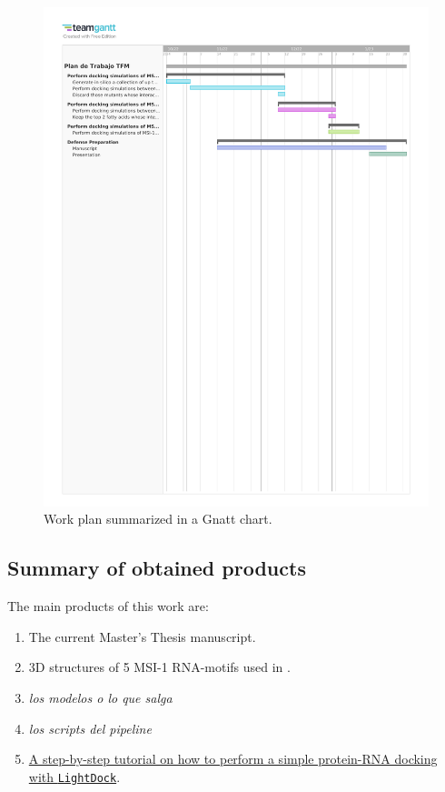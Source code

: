 \begin{figure}[htbp!]
    \centering
    \includegraphics[width=\linewidth, trim={1cm 18.5cm 1cm 2cm},clip]{assets/Plan_de_Trabajo_TFM.pdf}
    \caption{Work plan summarized in a Gnatt chart.}
    \label{fig:gnatt}    
\end{figure}

\subsection{Summary of obtained products}

The main products of this work are:

\begin{enumerate}
    \item The current Master's Thesis manuscript.
    \item 3D structures of 5 MSI-1 RNA-motifs used in \cite{dolcemascolo_2022}.
    \item\textit{los modelos o lo que salga}
    \item\textit{los scripts del pipeline}
    \item\href{https://lightdock.org/tutorials/0.9.3/rna_docking}{A step-by-step tutorial on how to perform a simple protein-RNA docking with \texttt{LightDock}}.
\end{enumerate}

